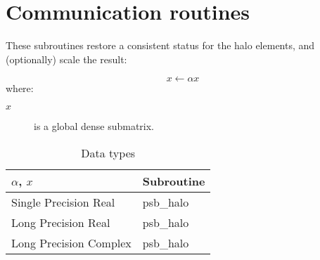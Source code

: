 \section{Communication routines}
%
%



These subroutines restore a consistent status for the halo
elements, and  (optionally) scale the result:

\[ x \leftarrow \alpha x \]
where:
\begin{description}
\item[$x$] is a global dense  submatrix.
\end{description}

\begin{table}[h]
\begin{center}
\begin{tabular}{ll}
\hline
$\alpha$, $x$ & {\bf Subroutine}\\
\hline
Single Precision Real & psb\_halo\\
Long Precision Real & psb\_halo \\
Long Precision Complex & psb\_halo \\
\hline
\end{tabular}
\end{center}
\caption{Data types\label{tab:f90halo}}
\end{table}


